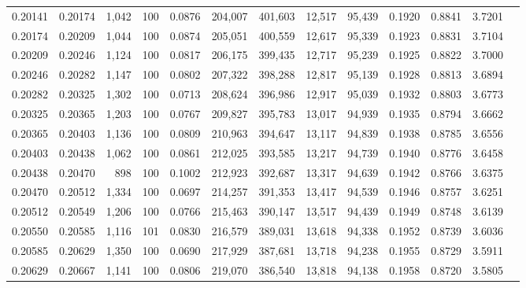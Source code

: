 \begin{tabular}{rrrrrrrrrrrrr}
0.20141 & 0.20174 & 1,042 & 100 &                                     0.0876 & 204,007 & 401,603 &  12,517 &  95,439 & 0.1920 & 0.8841 & 3.7201 \\
0.20174 & 0.20209 & 1,044 & 100 &                                     0.0874 & 205,051 & 400,559 &  12,617 &  95,339 & 0.1923 & 0.8831 & 3.7104 \\
0.20209 & 0.20246 & 1,124 & 100 &                                     0.0817 & 206,175 & 399,435 &  12,717 &  95,239 & 0.1925 & 0.8822 & 3.7000 \\
0.20246 & 0.20282 & 1,147 & 100 &                                     0.0802 & 207,322 & 398,288 &  12,817 &  95,139 & 0.1928 & 0.8813 & 3.6894 \\
0.20282 & 0.20325 & 1,302 & 100 &                                     0.0713 & 208,624 & 396,986 &  12,917 &  95,039 & 0.1932 & 0.8803 & 3.6773 \\
0.20325 & 0.20365 & 1,203 & 100 &                                     0.0767 & 209,827 & 395,783 &  13,017 &  94,939 & 0.1935 & 0.8794 & 3.6662 \\
0.20365 & 0.20403 & 1,136 & 100 &                                     0.0809 & 210,963 & 394,647 &  13,117 &  94,839 & 0.1938 & 0.8785 & 3.6556 \\
0.20403 & 0.20438 & 1,062 & 100 &                                     0.0861 & 212,025 & 393,585 &  13,217 &  94,739 & 0.1940 & 0.8776 & 3.6458 \\
0.20438 & 0.20470 &   898 & 100 &                                     0.1002 & 212,923 & 392,687 &  13,317 &  94,639 & 0.1942 & 0.8766 & 3.6375 \\
0.20470 & 0.20512 & 1,334 & 100 &                                     0.0697 & 214,257 & 391,353 &  13,417 &  94,539 & 0.1946 & 0.8757 & 3.6251 \\
0.20512 & 0.20549 & 1,206 & 100 &                                     0.0766 & 215,463 & 390,147 &  13,517 &  94,439 & 0.1949 & 0.8748 & 3.6139 \\
0.20550 & 0.20585 & 1,116 & 101 &                                     0.0830 & 216,579 & 389,031 &  13,618 &  94,338 & 0.1952 & 0.8739 & 3.6036 \\
0.20585 & 0.20629 & 1,350 & 100 &                                     0.0690 & 217,929 & 387,681 &  13,718 &  94,238 & 0.1955 & 0.8729 & 3.5911 \\
0.20629 & 0.20667 & 1,141 & 100 &                                     0.0806 & 219,070 & 386,540 &  13,818 &  94,138 & 0.1958 & 0.8720 & 3.5805 \\

\end{tabular}

